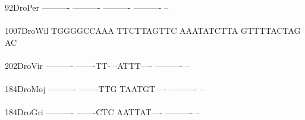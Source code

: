 \documentclass[11pt,twoside,reqno,a4paper]{article}
\begin{document}
{92\hspace*{3\charwidth}DroPer	----------	----------	----------	----------	--\\
\hspace*{5\charwidth}\hspace*{7\charwidth}\hspace*{1\charwidth}\hspace*{1\charwidth}\hspace*{1\charwidth}\hspace*{1\charwidth}\\
1007\hspace*{1\charwidth}DroWil	TGGGGCCAAA	TTCTTAGTTC	AAATATCTTA	GTTTTACTAG	AC\\
\hspace*{5\charwidth}\hspace*{7\charwidth}\hspace*{1\charwidth}\hspace*{1\charwidth}\hspace*{1\charwidth}\hspace*{1\charwidth}\\
202\hspace*{2\charwidth}DroVir	----------	-------TT-	--ATTT----	----------	--\\
\hspace*{5\charwidth}\hspace*{7\charwidth}\hspace*{1\charwidth}\hspace*{1\charwidth}\hspace*{1\charwidth}\hspace*{1\charwidth}\\
184\hspace*{2\charwidth}DroMoj	----------	-------TTG	TAATGT----	----------	--\\
\hspace*{5\charwidth}\hspace*{7\charwidth}\hspace*{1\charwidth}\hspace*{1\charwidth}\hspace*{1\charwidth}\hspace*{1\charwidth}\\
184\hspace*{2\charwidth}DroGri	----------	-------CTC	AATTAT----	----------	--\\
\hspace*{5\charwidth}\hspace*{7\charwidth}\hspace*{1\charwidth}\hspace*{1\charwidth}\hspace*{1\charwidth}\hspace*{1\charwidth}\\
\\
}
\end{document}
